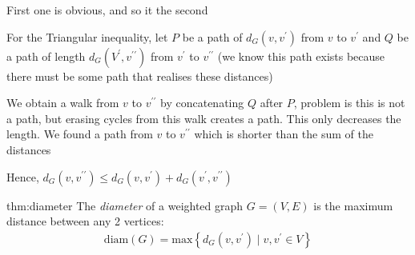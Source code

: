 \begin{prf}
  First one is obvious, and so it the second
  \par\bigskip
  \noindent For the Triangular inequality, let $P$ be a path of $d_G(v,v^{\prime})$ from $v$ to $v^{\prime}$  and $Q$ be a path of length $d_G(V^{\prime},v^{\prime\prime})$ from $v^{\prime}$ to $v^{\prime\prime}$ (we know this path exists because there must be some path that realises these distances)
  \par\bigskip
  \noindent We obtain a walk from $v$ to $v^{\prime\prime}$ by concatenating $Q$ after $P$, problem is this is not a path, but erasing cycles from this walk creates a path. This only decreases the length. We found a path from $v$ to $v^{\prime\prime}$  which is shorter than the sum of the distances
  \par\bigskip
  \noindent Hence, $d_G(v,v^{\prime\prime})\leq d_G(v,v^{\prime})+d_G(v^{\prime},v^{\prime\prime})$
\end{prf}
\par\bigskip
\begin{theo}[Diameter]{thm:diameter}
  The \textit{diameter} of a weighted graph $G = (V,E)$ is the maximum distance between any 2 vertices:
  \begin{equation*}
    \begin{gathered}
    \text{diam}(G) = \text{max}\left\{d_G(v,v^{\prime})\;|\; v,v^{\prime}\in V\right\}
    \end{gathered}
  \end{equation*}
\end{theo}
\newpage
